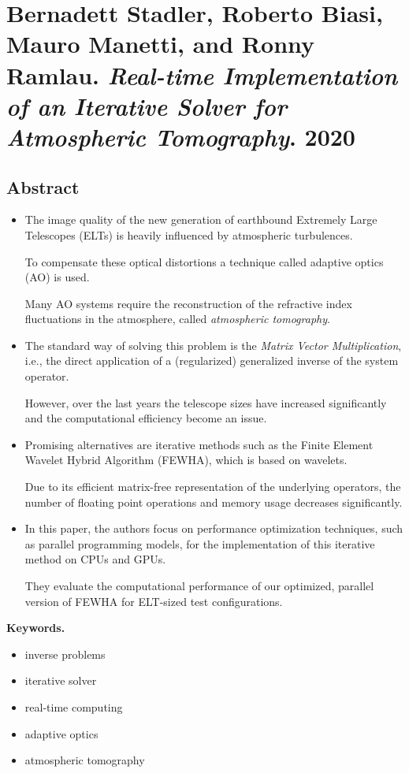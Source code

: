 \documentclass{book}
\numberwithin{equation}{section}
\begin{document}
\section{Bernadett Stadler, Roberto Biasi, Mauro Manetti, and Ronny Ramlau. \textit{Real-time Implementation of an Iterative Solver for Atmospheric Tomography}. 2020}

\subsection*{Abstract}
\begin{itemize}
    \item The image quality of the new generation of earthbound Extremely Large Telescopes (ELTs) is heavily influenced by atmospheric turbulences.
    
    To compensate these optical distortions a technique called adaptive optics (AO) is used.
    
    Many AO systems require the reconstruction of the refractive index fluctuations in the atmosphere, called \textit{atmospheric tomography}.
    \item The standard way of solving this problem is the \textit{Matrix Vector Multiplication}, i.e., the direct application of a (regularized) generalized inverse of the system operator.
    
    However, over the last years the telescope sizes have increased significantly and the computational efficiency become an issue.
    \item Promising alternatives are iterative methods such as the Finite Element Wavelet Hybrid Algorithm (FEWHA), which is based on wavelets.
    
    Due to its efficient matrix-free representation of the underlying operators, the number of floating point operations and memory usage decreases significantly.
    \item In this paper, the authors focus on performance optimization techniques, such as parallel programming models, for the implementation of this iterative method on CPUs and GPUs.
    
    They evaluate the computational performance of our optimized, parallel version of FEWHA for ELT-sized test configurations.
\end{itemize}
\textbf{Keywords.}
\begin{itemize}
    \item inverse problems
    \item iterative solver
    \item real-time computing
    \item adaptive optics
    \item atmospheric tomography
\end{itemize}
\end{document}
